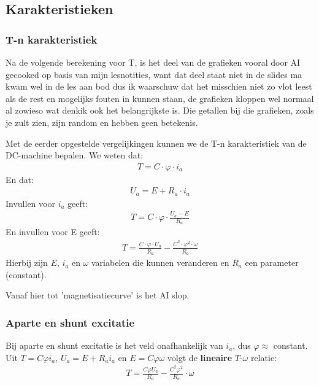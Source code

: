 \subsection{Karakteristieken}

\subsubsection{T-n karakteristiek}

\begin{warningbox}
  Na de volgende berekening voor T, is het deel van de grafieken vooral door AI gecooked
  op basis van mijn lesnotities, want dat deel staat niet in de slides ma kwam wel in de
  les aan bod dus ik waarschuw dat het misschien niet zo vlot leest als de rest en
  mogelijks fouten in kunnen staan, de grafieken kloppen wel normaal al zowieso wat denkik
  ook het belangrijkste is.
  Die getallen bij die grafieken, zoals je zult zien, zijn random en hebben geen
  betekenis.
\end{warningbox}

Met de eerder opgestelde vergelijkingen kunnen we de T-n karakteristiek van de DC-machine
bepalen.
We weten dat:
\begin{align*}
    T = C \cdot \varphi \cdot i_a
\end{align*}
En dat:
\begin{align*}
    U_a = E + R_a \cdot i_a
\end{align*}
Invullen voor $i_a$ geeft:
\begin{align*}
    T = C \cdot \varphi \cdot \frac{U_a - E}{R_a}
\end{align*}
En invullen voor E geeft:
\begin{align*}
    T = \frac{C \cdot \varphi \cdot U_a}{R_a} - \frac{C^2 \cdot \varphi^2 \cdot \omega}{R_a}
\end{align*}
Hierbij zijn $E$, $i_a$ en $\omega$ variabelen die kunnen veranderen en $R_a$ een
parameter (constant).

{\color{red}Vanaf hier tot 'magnetisatiecurve' is het AI slop.}

\subsubsection{Aparte en shunt excitatie}
Bij aparte en shunt excitatie is het veld onafhankelijk van $i_a$, dus $\varphi \approx$
constant.
Uit $T = C\varphi i_a$, $U_a = E + R_a i_a$ en $E = C\varphi\omega$ volgt de
\textbf{lineaire} $T$-$\omega$ relatie:
\begin{align*}
    T = \frac{C \varphi U_a}{R_a} - \frac{C^2 \varphi^2}{R_a} \cdot \omega
\end{align*}

